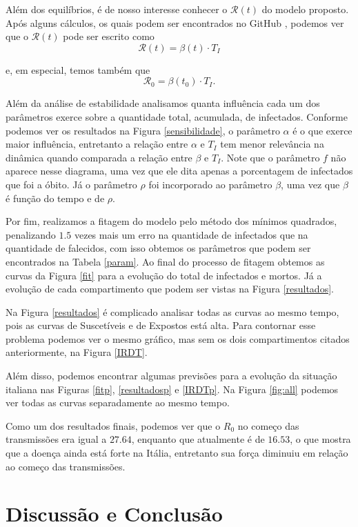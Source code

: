 \documentclass{article}
\begin{document}
Além dos equilíbrios, é de nosso interesse conhecer o $\mathcal{R}(t)$ do modelo proposto. Após alguns cálculos, os quais podem ser encontrados no GitHub \cite{github}, podemos ver que o $\mathcal{R}(t)$ pode ser escrito como
\[\mathcal{R}(t) = \beta(t)\cdot T_I\]

\noindent e, em especial, temos também que
\[\mathcal{R}_0 = \beta(t_0)\cdot T_I.\]

Além da análise de estabilidade analisamos quanta influência cada um dos parâmetros exerce sobre a quantidade total, acumulada, de infectados. Conforme podemos ver os resultados na Figura \ref{sensibilidade}, o parâmetro $\alpha$ é o que exerce maior influência, entretanto a relação entre $\alpha$ e $T_I$ tem menor relevância na dinâmica quando comparada a relação entre $\beta$ e $T_I$. Note que o parâmetro $f$ não aparece nesse diagrama, uma vez que ele dita apenas a porcentagem de infectados que foi a óbito. Já o parâmetro $\rho$ foi incorporado ao parâmetro $\beta$, uma vez que $\beta$ é função do tempo e de $\rho$.

Por fim, realizamos a fitagem do modelo pelo método dos mínimos quadrados, penalizando $1.5$ vezes mais um erro na quantidade de infectados que na quantidade de falecidos, com isso obtemos os parâmetros que podem ser encontrados na Tabela \ref{param}. Ao final do processo de fitagem obtemos as curvas da Figura \ref{fit} para a evolução do total de infectados e mortos. Já a evolução de cada compartimento que podem ser vistas na Figura \ref{resultados}.

Na Figura \ref{resultados} é complicado analisar todas as curvas ao mesmo tempo, pois as curvas de Suscetíveis e de Expostos está alta. Para contornar esse problema podemos ver o mesmo gráfico, mas sem os dois compartimentos citados anteriormente, na Figura \ref{IRDT}.

Além disso, podemos encontrar algumas previsões para a evolução da situação italiana nas Figuras \ref{fitp}, \ref{resultadosp} e \ref{IRDTp}. Na Figura \ref{fig:all} podemos ver todas as curvas separadamente ao mesmo tempo.

Como um dos resultados finais, podemos ver que o $R_0$ no começo das transmissões era igual a $27.64$, enquanto que atualmente é de $16.53$, o que mostra que a doença ainda está forte na Itália, entretanto sua força diminuiu em relação ao começo das transmissões.

\section{Discussão e Conclusão}
\end{document}
